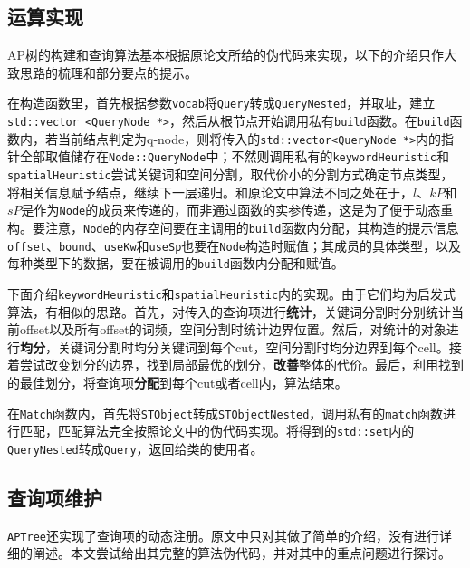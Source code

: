 \documentclass[UTF8]{ctexart}
\begin{document}
\subsection{运算实现}
AP树的构建和查询算法基本根据原论文所给的伪代码来实现，以下的介绍只作大致思路的梳理和部分要点的提示。

在构造函数里，首先根据参数\texttt{vocab}将\texttt{Query}转成\texttt{QueryNested}，并取址，建立\texttt{std::vector <QueryNode *>}，然后从根节点开始调用私有\texttt{build}函数。在\texttt{build}函数内，若当前结点判定为q-node，则将传入的\texttt{std::vector<QueryNode *>}内的指针全部取值储存在\texttt{Node::QueryNode}中；不然则调用私有的\texttt{keywordHeuristic}和\texttt{spatialHeuristic}尝试关键词和空间分割，取代价小的分割方式确定节点类型，将相关信息赋予结点，继续下一层递归。和原论文中算法不同之处在于，$l$、$kP$和$sP$是作为\texttt{Node}的成员来传递的，而非通过函数的实参传递，这是为了便于动态重构。要注意，\texttt{Node}的内存空间要在主调用的\texttt{build}函数内分配，其构造的提示信息\texttt{offset}、\texttt{bound}、\texttt{useKw}和\texttt{useSp}也要在\texttt{Node}构造时赋值；其成员的具体类型，以及每种类型下的数据，要在被调用的\texttt{build}函数内分配和赋值。

下面介绍\texttt{keywordHeuristic}和\texttt{spatialHeuristic}内的实现。由于它们均为启发式算法，有相似的思路。首先，对传入的查询项进行\textbf{统计}，关键词分割时分别统计当前offset以及所有offset的词频，空间分割时统计边界位置。然后，对统计的对象进行\textbf{均分}，关键词分割时均分关键词到每个cut，空间分割时均分边界到每个cell。接着尝试改变划分的边界，找到局部最优的划分，\textbf{改善}整体的代价。最后，利用找到的最佳划分，将查询项\textbf{分配}到每个cut或者cell内，算法结束。

在\texttt{Match}函数内，首先将\texttt{STObject}转成\texttt{STObjectNested}，调用私有的\texttt{match}函数进行匹配，匹配算法完全按照论文中的伪代码实现。将得到的\texttt{std::set}内的\texttt{QueryNested}转成\texttt{Query}，返回给类的使用者。

\subsection{查询项维护}
\texttt{APTree}还实现了查询项的动态注册。原文中只对其做了简单的介绍，没有进行详细的阐述。本文尝试给出其完整的算法伪代码，并对其中的重点问题进行探讨。
\end{document}
